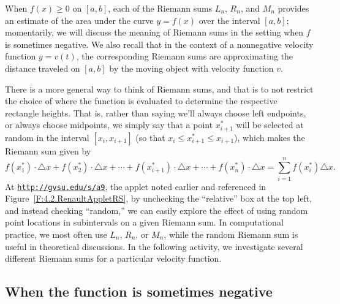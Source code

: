 When $f(x) \ge 0$ on $[a,b]$, each of the Riemann sums $L_n$, $R_n$, and $M_n$ provides an estimate of the area under the curve $y = f(x)$ over the interval $[a,b]$; momentarily, we will discuss the meaning of Riemann sums in the setting when $f$ is sometimes negative.  We also recall that in the context of a nonnegative velocity function $y = v(t)$, the corresponding Riemann sums are approximating the distance traveled on $[a,b]$ by the moving object with velocity function $v$.

There is a more general way to think of Riemann sums, and that is to not restrict the choice of where the function is evaluated to determine the respective rectangle heights.  That is, rather than saying we'll always choose left endpoints, or always choose midpoints, we simply say that a point $x_{i+1}^*$ will be selected at random in the interval $[x_i, x_{i+1}]$ (so that $x_i \le x_{i+1}^* \le x_{i+1}$), which makes the Riemann sum given by 
$$f(x_1^*) \cdot \triangle x + f(x_2^*) \cdot \triangle x + \cdots + f(x_{i+1}^*) \cdot \triangle x + \cdots + f(x_n^*) \cdot \triangle x = \sum_{i=1}^{n} f(x_i^*) \triangle x.$$
At \href{http://gvsu.edu/s/a9}{\texttt{http://gvsu.edu/s/a9}}, the applet noted earlier and referenced in Figure~\ref{F:4.2.RenaultAppletRS}, by unchecking the ``relative'' box at the top left, and instead checking ``random,'' we can easily explore the effect of using random point locations in subintervals on a given Riemann sum.  In computational practice, we most often use $L_n$, $R_n$, or $M_n$, while the random Riemann sum is useful in theoretical discussions.  In the following activity, we investigate several different Riemann sums for a particular velocity function.



\subsection*{When the function is sometimes negative}

